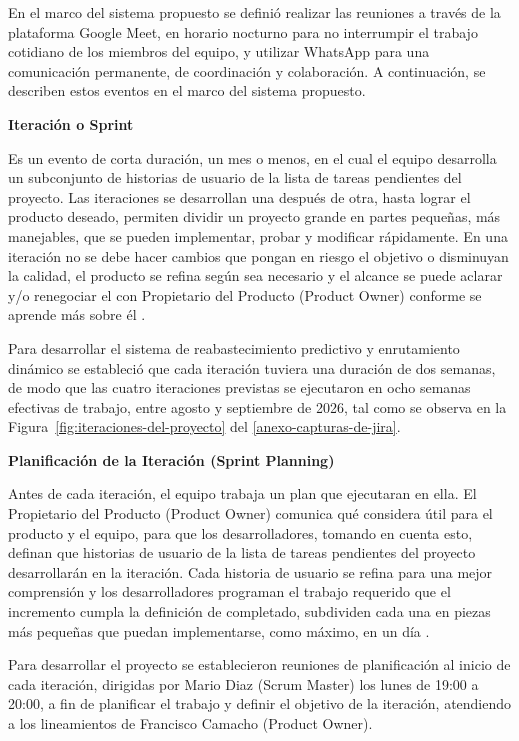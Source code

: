 En el marco del sistema propuesto se definió realizar las reuniones a través de la plataforma Google Meet, en horario nocturno para no interrumpir el trabajo cotidiano de los miembros del equipo, y utilizar WhatsApp para una comunicación permanente, de coordinación y colaboración. A continuación, se describen estos eventos en el marco del sistema propuesto.

\textbf{Iteración o Sprint}

Es un evento de corta duración, un mes o menos, en el cual el equipo desarrolla un subconjunto de historias de usuario de la lista de tareas pendientes del proyecto. Las iteraciones se desarrollan una después de otra, hasta lograr el producto deseado, permiten dividir un proyecto grande en partes pequeñas, más manejables, que se pueden implementar, probar y modificar rápidamente. En una iteración no se debe hacer cambios que pongan en riesgo el objetivo o disminuyan la calidad, el producto se refina según sea necesario y el alcance se puede aclarar y/o renegociar el con Propietario del Producto (Product Owner) conforme se aprende más sobre él \citep{schwaber2020}.

Para desarrollar el sistema de reabastecimiento predictivo y enrutamiento dinámico se estableció que cada iteración tuviera una duración de dos semanas, de modo que las cuatro iteraciones previstas se ejecutaron en ocho semanas efectivas de trabajo, entre agosto y septiembre de 2026, tal como se observa en la Figura~\ref{fig:iteraciones-del-proyecto} del \ref{anexo-capturas-de-jira}.

\textbf{Planificación de la Iteración (Sprint Planning)}

Antes de cada iteración, el equipo trabaja un plan que ejecutaran en ella. El Propietario del Producto (Product Owner) comunica qué considera útil para el producto y el equipo, para que los desarrolladores, tomando en cuenta esto, definan que historias de usuario de la lista de tareas pendientes del proyecto desarrollarán en la iteración. Cada historia de usuario se refina para una mejor comprensión y los desarrolladores programan el trabajo requerido que el incremento cumpla la definición de completado, subdividen cada una en piezas más pequeñas que puedan implementarse, como máximo, en un día \citep{schwaber2020}.

Para desarrollar el proyecto se establecieron reuniones de planificación al inicio de cada iteración, dirigidas por Mario Diaz (Scrum Master) los lunes de 19:00 a 20:00, a fin de planificar el trabajo y definir el objetivo de la iteración, atendiendo a los lineamientos de Francisco Camacho (Product Owner).

